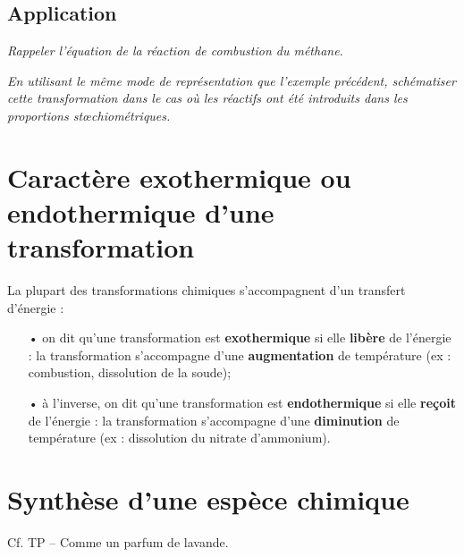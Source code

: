 \documentclass[12pt,a4paper,fleqn]{article}
\begin{document}
\subsection*{Application}

\emph{Rappeler l'équation de la réaction de combustion du méthane.}
\begin{center}
\end{center}

\emph{En utilisant le même mode de représentation que l'exemple précédent, schématiser cette transformation dans le cas où les réactifs ont été introduits dans les proportions stœchiométriques.}

\begin{center}
\end{center}

\section{Caractère exothermique ou endothermique d'une transformation}

La plupart des transformations chimiques s'accompagnent d'un transfert d'énergie :
\begin{itemize}
\item[•] on dit qu'une transformation est \textbf{exothermique} si elle \textbf{libère} de l'énergie : la transformation s'accompagne d'une \textbf{augmentation} de température (ex : combustion, dissolution de la soude);
\item[•] à l'inverse, on dit qu'une transformation est \textbf{endothermique} si elle \textbf{reçoit} de l'énergie : la transformation s'accompagne d'une \textbf{diminution} de température (ex : dissolution du nitrate d'ammonium).
\end{itemize}

\section{Synthèse d'une espèce chimique}

Cf. TP -- Comme un parfum de lavande.
\end{document}
